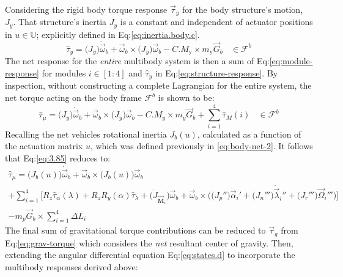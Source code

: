 Considering the rigid body torque response $\vec{\tau}_y$ for the body structure's motion, $J_y$. That structure's inertia $J_y$ is a constant and independent of actuator positions in $u\in\mathbb{U}$; explicitly defined in Eq:\ref{eq:inertia.body.c}.
\begin{equation}\label{eq:structure-response}
\hat{\tau}_y=\big(J_y\big)\dot{\vec{\omega}}_b+\vec{\omega}_b\times\big(J_y\big)\vec{\omega}_b-C.M_\text{y}\times m_\text{y}\vec{G}_b~~~~\in\mathcal{F}^b
\end{equation}
The net response for the \emph{entire} multibody system is then a sum of Eq:\ref{eq:module-response} for modules $i\in[1:4]$ and $\hat{\tau}_y$ in Eq:\ref{eq:structure-response}. By inspection, without constructing a complete Lagrangian for the entire system, the net torque acting on the body frame $\mathcal{F}^b$ is shown to be:
\begin{equation}\label{eq:3.85}
\hat{\tau}_\mu = \big(J_y\big)\dot{\vec{\omega}}_b+\vec{\omega}_b\times\big(J_y\big)\vec{\omega}_b-C.M_y\times m_y\vec{G}_b+\sum_{i=1}^{4}\hat{\tau}_{M}(i)~~~~\in\mathcal{F}^b
\end{equation}
Recalling the net vehicles rotational inertia $J_b(u)$, calculated as a function of the actuation matrix $u$, which was defined previously in \ref{eq:body-net-2}. It follows that Eq:\ref{eq:3.85} reduces to:
\begin{multline}\label{eq:3.109}
\hat{\tau}_\mu=\big(J_b(u)\big)\dot{\vec{\omega}}_b+\vec{\omega}_b\times\big(J_b(u)\big)\vec{\omega}_b
\\
+\sum_{i=1}^{4}\Big[R_z\hat{\tau}_\alpha(\lambda)+R_zR_y(\alpha)\hat{\tau}_\lambda+\big(\dot{J}_{\vec{\mathbf{M}}_i}\big)\vec{\omega}_b+\vec{\omega}_b\times\Big(\big(J_p''\big)\dot{\vec{\alpha}}_i'+\big(J_n'''\big)\dot{\vec{\lambda}}_i''+\big(J_r'''\big)\vec{\Omega}_i'''\Big)\Big]
\\
-m_p\vec{G}_b\times\sum_{i=1}^{4}\Delta L_i
\end{multline}
The final sum of gravitational torque contributions can be reduced to $\vec{\tau}_g$ from Eq:\ref{eq:grav-torque} which considers the \emph{net} resultant center of gravity. Then, extending the angular differential equation Eq:\ref{eq:states.d} to incorporate the multibody responses derived above:
